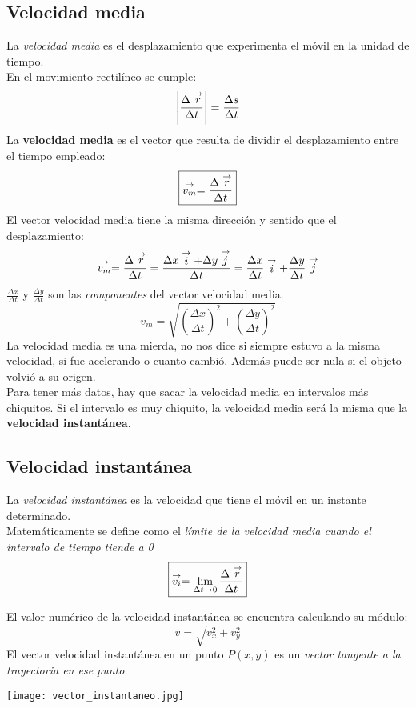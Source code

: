 \subsection{Velocidad media}
La \emph{velocidad media} es el desplazamiento que experimenta el móvil en la unidad de tiempo.\\
En el movimiento rectilíneo se cumple:
$$\left| \frac{\Delta \stackrel{\to}{r}}{\Delta t} \right| = \frac{\Delta s}{\Delta t}$$
La \textbf{velocidad media} es el vector que resulta de dividir el desplazamiento entre el tiempo empleado:
$$\boxed{\stackrel{\to}{v_m} = \frac{\Delta \stackrel{\to}{r}}{\Delta t}}$$
El vector velocidad media tiene la misma dirección y sentido que el desplazamiento:
$$\stackrel{\to}{v_m} = \frac{\Delta \stackrel{\to}{r}}{\Delta t} = \frac{\Delta x \stackrel{\to}{i} + \Delta y \stackrel{\to}{j}}{\Delta t} = \frac{\Delta x}{\Delta t}\stackrel{\to}{i} + \frac{\Delta y}{\Delta t} \stackrel{\to}{j}$$
$\frac{\Delta x}{\Delta t}$ y $\frac{\Delta y}{\Delta t}$ son las \emph{componentes} del vector velocidad media.
$$v_m = \sqrt{\left(\frac{\Delta x}{\Delta t}\right)^2 + \left(\frac{\Delta y}{\Delta t}\right)^2}$$
La velocidad media es una mierda, no nos dice si siempre estuvo a la misma velocidad, si fue acelerando o cuanto cambió. Además puede ser nula si el objeto volvió a su origen.\\
Para tener más datos, hay que sacar la velocidad media en intervalos más chiquitos. Si el intervalo es muy chiquito, la velocidad media será la misma que la \textbf{velocidad instantánea}.

\subsection{Velocidad instantánea}
La \emph{velocidad instantánea} es la velocidad que tiene el móvil en un instante determinado.\\
Matemáticamente se define como el \emph{límite de la velocidad media cuando el intervalo de tiempo tiende a 0}
$$\boxed{\stackrel{\to}{v_i} = \lim_{\Delta t \to 0} \frac{\Delta \stackrel{\to}{r}}{\Delta t}}$$

El valor numérico de la velocidad instantánea se encuentra calculando su módulo:
$$v = \sqrt{v^2_x + v^2_y}$$
El vector velocidad instantánea en un punto $P(x,y)$ es un \emph{vector tangente a la trayectoria en ese punto}.
\begin{center}
    \texttt{[image: vector\_instantaneo.jpg]}
\end{center}


